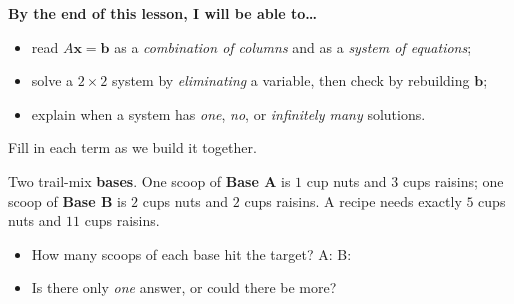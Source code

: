 \documentclass[10pt]{article}
\newcommand{\xx}{\mathbf{x}}
\newcommand{\bb}{\mathbf{b}}
\begin{document}

\vspace{0.12in}

\begin{objectivebox}
\textbf{By the end of this lesson, I will be able to\dots}
\begin{itemize}\setlength{\itemsep}{2pt}
  \item read $A\xx=\bb$ as a \emph{combination of columns} and as a \emph{system of equations};
  \item solve a $2\times 2$ system by \emph{eliminating} a variable, then check by rebuilding $\bb$;
  \item explain when a system has \emph{one}, \emph{no}, or \emph{infinitely many} solutions.
\end{itemize}
\end{objectivebox}

\vspace{0.10in}

\begin{vocabbox}
\small
Fill in each term as we build it together.
\par\vspace{2pt}
\termblanklong{Matrix form $A\xx=\bb$}
\end{vocabbox}

\begin{hookbox}
Two trail-mix \textbf{bases}. One scoop of \textbf{Base A} is $1$ cup nuts and $3$ cups raisins;
one scoop of \textbf{Base B} is $2$ cups nuts and $2$ cups raisins. A recipe needs exactly
$5$ cups nuts and $11$ cups raisins.
\begin{itemize}\setlength{\itemsep}{1pt}
  \item How many scoops of each base hit the target? \; A: \blank{1.6cm} B: \blank{1.6cm}
  \item Is there only \emph{one} answer, or could there be more? \writeline
\end{itemize}
\end{hookbox}
\end{document}
